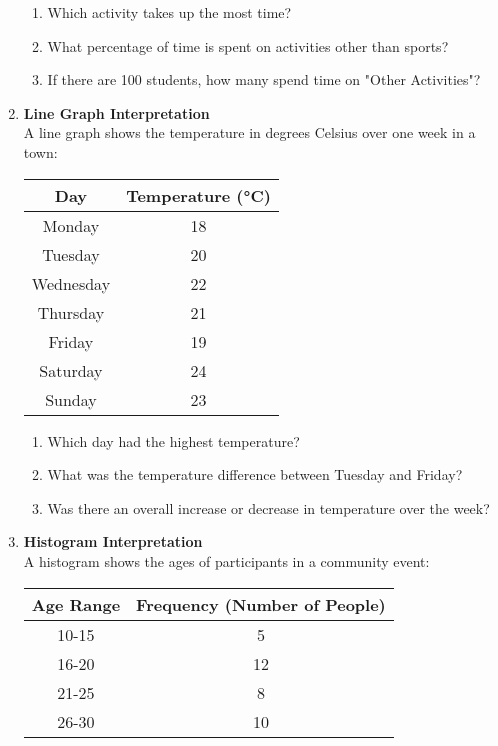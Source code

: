 \begin{enumerate}[label=\color{blue}\arabic*.]
    \begin{enumerate}[label=(\alph*)]
        \item Which activity takes up the most time?
        \item What percentage of time is spent on activities other than sports?
        \item If there are 100 students, how many spend time on "Other Activities"?
    \end{enumerate}

    \item \textbf{Line Graph Interpretation} \\
    A line graph shows the temperature in degrees Celsius over one week in a town:

    \begin{center}
    \begin{tabular}{|c|c|}
        \hline
        \textbf{Day} & \textbf{Temperature (°C)} \\
        \hline
        Monday & 18 \\
        Tuesday & 20 \\
        Wednesday & 22 \\
        Thursday & 21 \\
        Friday & 19 \\
        Saturday & 24 \\
        Sunday & 23 \\
        \hline
    \end{tabular}
    \end{center}

    \begin{enumerate}[label=(\alph*)]
        \item Which day had the highest temperature?
        \item What was the temperature difference between Tuesday and Friday?
        \item Was there an overall increase or decrease in temperature over the week?
    \end{enumerate}
    
    \item \textbf{Histogram Interpretation} \\
    A histogram shows the ages of participants in a community event:

    \begin{center}
    \begin{tabular}{|c|c|}
        \hline
        \textbf{Age Range} & \textbf{Frequency (Number of People)} \\
        \hline
        10-15 & 5 \\
        16-20 & 12 \\
        21-25 & 8 \\
        26-30 & 10 \\
        \hline
    \end{tabular}
    \end{center}


\end{enumerate}
